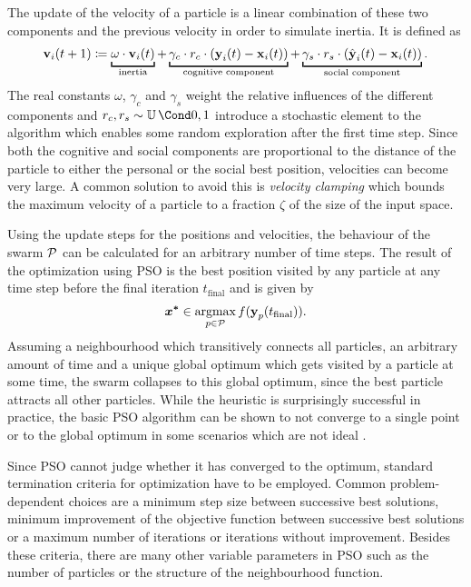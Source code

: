 The update of the velocity of a particle is a linear combination of these two components and the previous velocity in order to simulate inertia.
It is defined as
\begin{align}
    \label{eq:pso_velocity}
    \Vel_i(t+1) \coloneqq
        \underbracket[1pt]{\vphantom{\Cog_i}\omega \cdot \Vel_i(t)}_{\text{inertia}}
        + \underbracket[1pt]{\gamma_c \cdot r_c \cdot \left( \Cog_i(t) - \Pos_i(t) \right)}_{\text{cognitive component}}
        + \underbracket[1pt]{\gamma_s \cdot r_s \cdot \left( \Soc_i(t) - \Pos_i(t) \right)}_{\text{social component}}.
\end{align}
The real constants $\omega$, $\gamma_c$ and $\gamma_s$ weight the relative influences of the different components and $r_c, r_s \sim \Uniform{0, 1}$ introduce a stochastic element to the algorithm which enables some random exploration after the first time step.
Since both the cognitive and social components are proportional to the distance of the particle to either the personal or the social best position, velocities can become very large.
A common solution to avoid this is \emph{velocity clamping} which bounds the maximum velocity of a particle to a fraction $\zeta$ of the size of the input space.

Using the update steps for the positions and velocities, the behaviour of the swarm $\operatorname{\mathcal{P}}$ can be calculated for an arbitrary number of time steps.
The result of the optimization using PSO is the best position visited by any particle at any time step before the final iteration $t_{\text{final}}$ and is given by
\begin{align}
    \bm{x^\ast} \in \operatorname*{argmax}_{p \in \operatorname{\mathcal{P}}} f(\operatorname{\mathbf{y}}_p(t_{\text{final}})).
\end{align}
Assuming a neighbourhood which transitively connects all particles, an arbitrary amount of time and a unique global optimum which gets visited by a particle at some time, the swarm collapses to this global optimum, since the best particle attracts all other particles.
While the heuristic is surprisingly successful in practice, the basic PSO algorithm can be shown to not converge to a single point or to the global optimum in some scenarios which are not ideal \cite{engelbrecht_fundamentals_2006}.

Since PSO cannot judge whether it has converged to the optimum, standard termination criteria for optimization have to be employed.
Common problem-dependent choices are a minimum step size between successive best solutions, minimum improvement of the objective function between successive best solutions or a maximum number of iterations or iterations without improvement.
Besides these criteria, there are many other variable parameters in PSO such as the number of particles or the structure of the neighbourhood function.

